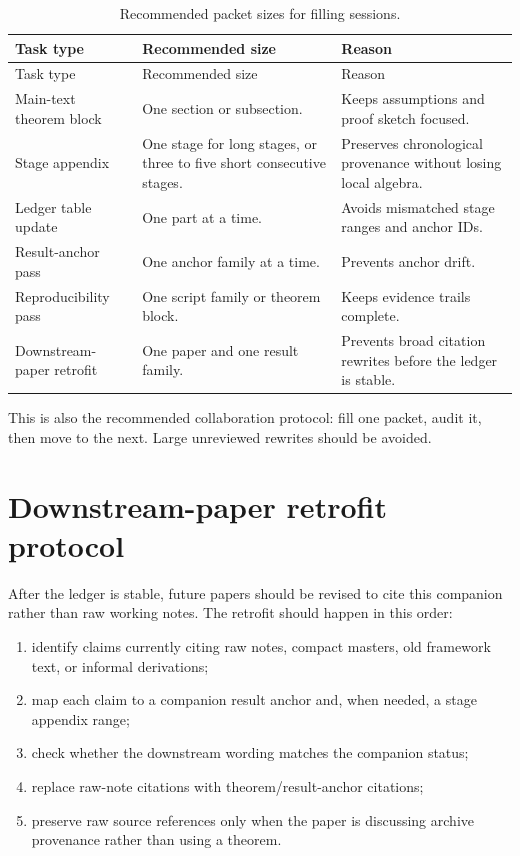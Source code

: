 \begin{longtable}{@{}L{0.26\textwidth}L{0.31\textwidth}L{0.32\textwidth}@{}}
\caption{Recommended packet sizes for filling sessions.}\label{tab:suggested-packet-sizes}\\
\toprule
Task type & Recommended size & Reason \\
\midrule
\endfirsthead
\toprule
Task type & Recommended size & Reason \\
\midrule
\endhead
Main-text theorem block & One section or subsection. & Keeps assumptions and proof sketch focused. \\
\addlinespace
Stage appendix & One stage for long stages, or three to five short consecutive stages. & Preserves chronological provenance without losing local algebra. \\
\addlinespace
Ledger table update & One part at a time. & Avoids mismatched stage ranges and anchor IDs. \\
\addlinespace
Result-anchor pass & One anchor family at a time. & Prevents anchor drift. \\
\addlinespace
Reproducibility pass & One script family or theorem block. & Keeps evidence trails complete. \\
\addlinespace
Downstream-paper retrofit & One paper and one result family. & Prevents broad citation rewrites before the ledger is stable. \\
\bottomrule
\end{longtable}

This is also the recommended collaboration protocol: fill one packet, audit it, then move to the next.  Large unreviewed rewrites should be avoided.

\section{Downstream-paper retrofit protocol}
\label{sec:downstream-paper-retrofit-protocol}

After the ledger is stable, future papers should be revised to cite this companion rather than raw working notes.  The retrofit should happen in this order:

\begin{enumerate}[leftmargin=2.0em]
\item identify claims currently citing raw notes, compact masters, old framework text, or informal derivations;
\item map each claim to a companion result anchor and, when needed, a stage appendix range;
\item check whether the downstream wording matches the companion status;
\item replace raw-note citations with theorem/result-anchor citations;
\item preserve raw source references only when the paper is discussing archive provenance rather than using a theorem.
\end{enumerate}

